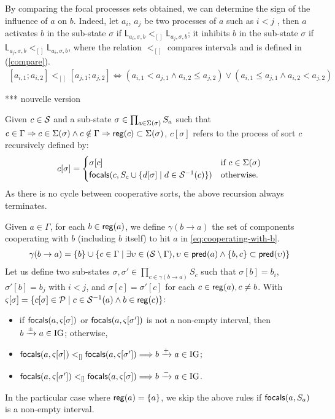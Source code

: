 By comparing the focal processes sets obtained, we can determine the sign of the influence of $a$ on $b$. Indeed, let $a_i$, $a_j$ be two processes of $a$ such as $i < j$ , then $a$ activates $b$ in the sub-state $\sigma$ if $\mathsf{L}_{a_i,\sigma,b} <_{[]} \mathsf{L}_{a_j,\sigma,b}$; it inhibits $b$ in the sub-state $\sigma$ if $\mathsf{L}_{a_j,\sigma,b} <_{[]} \mathsf{L}_{a_i,\sigma,b}$, where the relation $<_{[]}$ compares intervals and is defined in (\ref{compare}).
\begin{align}
\label{compare}
  [a_{i,1} ; a_{i,2}] <_{[]} [a_{j,1} ; a_{j,2}] \Leftrightarrow (a_{i,1} < a_{j,1} \wedge a_{i,2} \leq a_{j,2}) \vee (a_{i,1} \leq a_{j,1} \wedge a_{i,2} < a_{j,2})
\end{align}

*** nouvelle version


Given $c\in\mathcal{S}$ and a sub-state $\sigma\in\prod_{a\in\Sigma(\sigma)} S_a$
such that $c\in\Gamma\Rightarrow c\in\Sigma(\sigma) \wedge
c\notin\Gamma\Rightarrow \mathsf{reg}({c})\subset\Sigma(\sigma)$,
$c[\sigma]$ refers to the process of sort $c$ recursively defined by:
\begin{equation}
c[\sigma] = 
\begin{cases}
\sigma[c] & \text{if } c\in\Sigma(\sigma) \\
\mathsf{focals}(c, S_c \cup \{ d[\sigma] \mid d\in\mathcal{S}^{-1}(c) \})
	& \text{otherwise.}
\end{cases}
\label{eq:proc-ctx}
\end{equation}
As there is no cycle between cooperative sorts, the above recursion always terminates.

Given $a\in\Gamma$, for each $b\in\mathsf{reg}({a})$,
we define $\gamma(b\rightarrow a)$ the set of components cooperating with $b$ (including $b$ itself)
to hit $a$ in \eqref{eq:cooperating-with-b}.
\begin{align}
\begin{split}
\gamma(b\rightarrow a) = \{ b \} \cup \{ c \in \Gamma \mid 
			\exists \upsilon\in(\mathcal{S}\setminus\Gamma),
				\upsilon\in\mathsf{pred}(a) \wedge \{b,c\}\subset\mathsf{pred}(\upsilon) \}
\end{split}
\label{eq:cooperating-with-b}
\end{align}
Let us define two sub-states $\sigma,\sigma'\in \prod_{c\in\gamma(b\rightarrow a)} S_c$ such that
$\sigma[b]=b_i$, $\sigma'[b]=b_j$ with $i < j$,
and $\sigma[c]=\sigma'[c]$ for each $c\in\mathsf{reg}({a}), c\neq b$.
With $\varsigma[\sigma] = \{ c[\sigma] \in \mathcal{P} \mid c\in\mathcal{S}^{-1}(a) \wedge b\in \mathsf{reg}({c})
\}$:
\begin{itemize}
\item if $\mathsf{focals}(a,\varsigma[\sigma])$ or $\mathsf{focals}(a,\varsigma[\sigma'])$ is not a non-empty interval, then
			$b\xrightarrow{\pm}a\in \mathrm{IG}$; otherwise,
\item $\mathsf{focals}(a,\varsigma[\sigma]) <_{[]} \mathsf{focals}(a,\varsigma[\sigma']) \Longrightarrow
			b\xrightarrow{+}a\in \mathrm{IG}$;
\item $\mathsf{focals}(a,\varsigma[\sigma']) <_{[]} \mathsf{focals}(a,\varsigma[\sigma]) \Longrightarrow
			b\xrightarrow{-}a\in \mathrm{IG}$.
\end{itemize}

In the particular case where $\mathsf{reg}({a})=\{a\}$,
we skip the above rules if $\mathsf{focals}(a,S_a)$ is a non-empty interval.




